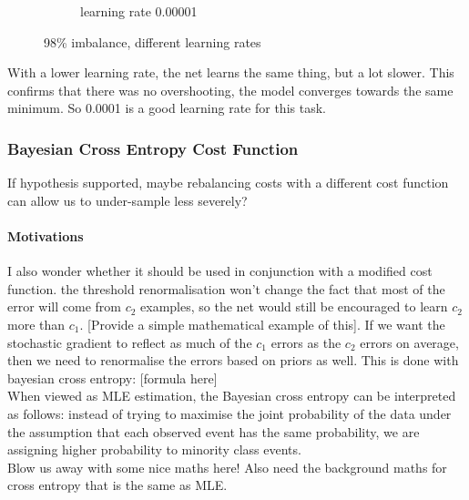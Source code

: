 \documentclass[a4paper,11pt]{article}
\begin{document}
\begin{figure}
\begin{minipage}[b]{\textwidth}
\begin{subfigure}{.5\textwidth}
        \caption{learning rate 0.00001}\label{fig:2b}
      \end{subfigure} \par \vspace*{20pt} %
      \caption{98\% imbalance, different learning rates}\label{fig:2}
    \end{minipage}%
\end{figure}

With a lower learning rate, the net learns the same thing, but a lot slower. This confirms that there was no overshooting, the model converges towards the same minimum. So 0.0001 is a good learning rate for this task. \\


\subsubsection{Bayesian Cross Entropy Cost Function}

If hypothesis supported, maybe rebalancing costs with a different cost function can allow us to under-sample less severely? \\


\paragraph{Motivations}

I also wonder whether it should be used in conjunction with a modified cost function. the threshold renormalisation won't change the fact that most of the error will come from $c_2$ examples, so the net would still be encouraged to learn $c_2$ more than $c_1$. [Provide a simple mathematical example of this]. If we want the stochastic gradient to reflect as much of the $c_1$ errors as the $c_2$ errors on average, then we need to renormalise the errors based on priors as well. This is done with bayesian cross entropy: [formula here] \\

When viewed as MLE estimation, the Bayesian cross entropy can be interpreted as follows: instead of trying to maximise the joint probability of the data under the assumption that each observed event has the same probability, we are assigning higher probability to minority class events. \\

Blow us away with some nice maths here! Also need the background maths for cross entropy that is the same as MLE. \\
\end{document}
